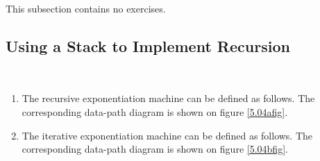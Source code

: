 This subsection contains no exercises.

\subsection{Using a Stack to Implement Recursion}

\begin{exe}[5.4]
    \label{5.04}
    \ \vspace{-20pt}
    \begin{enumerate}
	\item The recursive exponentiation machine can be defined as follows. 
	    The corresponding data-path diagram is shown on figure 
	    \ref{5.04afig}.
	\item The iterative exponentiation machine can be defined as follows. 
	    The corresponding data-path diagram is shown on figure 
	    \ref{5.04bfig}.
    \end{enumerate}

    \begin{figure}
        \centering
\end{figure}
\end{exe}
